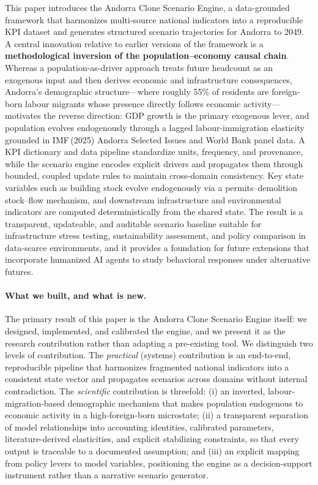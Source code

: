 \documentclass[urbansci,article,submit,pdftex,moreauthors]{Definitions/mdpi}
\begin{document}
This paper introduces the Andorra Clone Scenario Engine, a data-grounded
framework that harmonizes multi-source national indicators into a reproducible
KPI dataset and generates structured scenario trajectories for Andorra to 2049.
A central innovation relative to earlier versions of the framework is a
\textbf{methodological inversion of the population--economy causal chain}.
Whereas a population-as-driver approach treats future headcount as an
exogenous input and then derives economic and infrastructure consequences,
Andorra's demographic structure---where roughly 55\% of residents are
foreign-born labour migrants whose presence directly follows economic
activity---motivates the reverse direction: GDP growth is the primary
exogenous lever, and population evolves endogenously through a lagged
labour-immigration elasticity grounded in IMF\,(2025) Andorra Selected Issues
and World Bank panel data. A KPI dictionary and data pipeline standardize units,
frequency, and provenance, while the scenario engine encodes explicit drivers
and propagates them through bounded, coupled update rules to maintain
cross-domain consistency. Key state variables such as building stock evolve
endogenously via a permits--demolition stock--flow mechanism, and downstream
infrastructure and environmental indicators are computed deterministically from
the shared state. The result is a transparent, updateable, and auditable
scenario baseline suitable for infrastructure stress testing, sustainability
assessment, and policy comparison in data-scarce environments, and it provides
a foundation for future extensions that incorporate humanized AI agents to study
behavioral responses under alternative futures.

\paragraph{What we built, and what is new.}
The primary result of this paper is the Andorra Clone Scenario Engine itself: we
designed, implemented, and calibrated the engine, and we present it as the
research contribution rather than adapting a pre-existing tool. We distinguish two
levels of contribution. The \emph{practical} (systems) contribution is an
end-to-end, reproducible pipeline that harmonizes fragmented national indicators
into a consistent state vector and propagates scenarios across domains without
internal contradiction. The \emph{scientific} contribution is threefold: (i) an
inverted, labour-migration-based demographic mechanism that makes population
endogenous to economic activity in a high-foreign-born microstate; (ii) a
transparent separation of model relationships into accounting identities,
calibrated parameters, literature-derived elasticities, and explicit stabilizing
constraints, so that every output is traceable to a documented assumption; and
(iii) an explicit mapping from policy levers to model variables, positioning the
engine as a decision-support instrument rather than a narrative scenario
generator.
\end{document}
